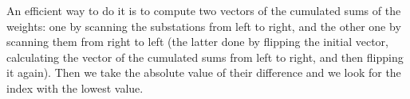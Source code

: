 An efficient way to do it is to compute two vectors of the cumulated sums of the weights: one by scanning the substations from left to right, and the other one by scanning them from right to left
(the latter done by flipping the initial vector, calculating the vector of the cumulated sums from left to right, and then flipping it again). Then we take the absolute value of their difference and we look for the index with the lowest value.